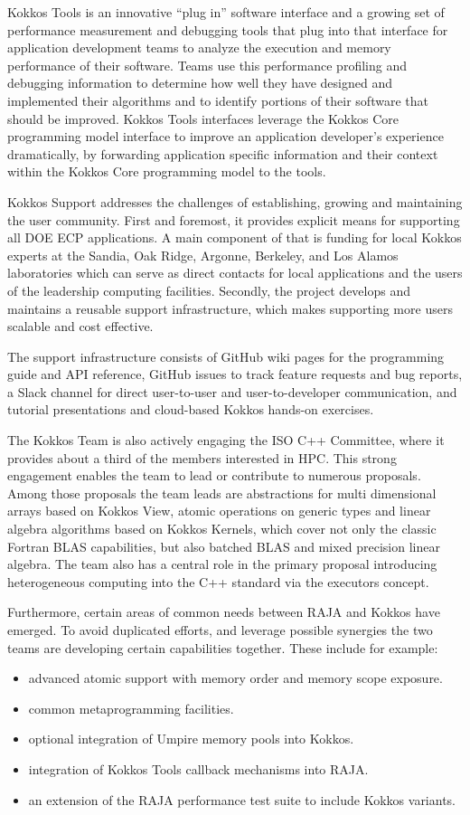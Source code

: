 Kokkos Tools is an innovative “plug in” software interface and a growing set of performance measurement and debugging tools that plug into that interface for application development teams to analyze the execution and memory performance of their software. Teams use this performance profiling and debugging information to determine how well they have designed and implemented their algorithms and to identify portions of their software that should be improved. Kokkos Tools interfaces  leverage the Kokkos Core programming model interface to improve an application developer’s experience dramatically, by forwarding application specific information and their context within the Kokkos Core programming model to the tools.

Kokkos Support addresses the challenges of establishing, growing and maintaining the user community.
First and foremost, it provides explicit means for supporting all DOE ECP applications. 
A main component of that is funding for local Kokkos experts at the Sandia, Oak Ridge, Argonne, Berkeley, and Los Alamos laboratories which can serve as direct contacts for local applications and the users of the leadership computing facilities. 
Secondly, the project develops and maintains a reusable support infrastructure, which makes supporting more users scalable and cost effective. 

The support infrastructure consists of GitHub wiki pages for the programming guide and API reference, GitHub issues to track feature requests and bug reports, a Slack channel for direct user-to-user and user-to-developer communication, and tutorial presentations and cloud-based Kokkos hands-on exercises. 

The Kokkos Team is also actively engaging the ISO C++ Committee, where it provides about a third of the members interested in HPC.
This strong engagement enables the team to lead or contribute to numerous proposals.
Among those proposals the team leads are abstractions for multi dimensional arrays based on Kokkos View, atomic operations on generic types and linear algebra algorithms based on Kokkos Kernels, which cover not only the classic Fortran BLAS capabilities, but also batched BLAS and mixed precision linear algebra.
The team also has a central role in the primary proposal introducing heterogeneous computing into the C++ standard via the executors concept.

Furthermore, certain areas of common needs between RAJA and Kokkos have emerged. 
To avoid duplicated efforts, and leverage possible synergies the two teams are developing certain capabilities together.
These include for example:
\begin{itemize}
 \item advanced atomic support with memory order and memory scope exposure.
 \item common metaprogramming facilities.
 \item optional integration of Umpire memory pools into Kokkos.
 \item integration of Kokkos Tools callback mechanisms into RAJA.
 \item an extension of the RAJA performance test suite to include Kokkos variants.
\end{itemize}


